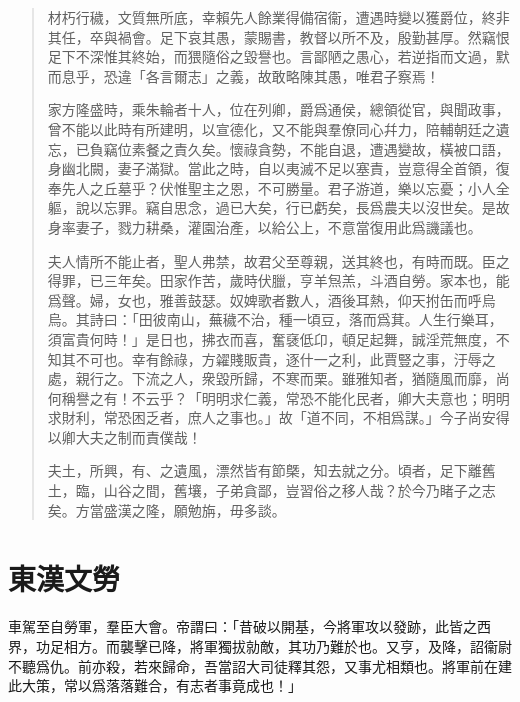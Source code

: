 \begin{quotation}
材朽行穢，文質無所底，幸賴先人餘業得備宿衞，遭遇時變以獲爵位，終非其任，卒與禍會。足下哀其愚，蒙賜書，教督以所不及，殷勤甚厚。然竊恨足下不深惟其終始，而猥隨俗之毀譽也。言鄙陋之愚心，若逆指而文過，默而息乎，恐違「各言爾志」之義，故敢略陳其愚，唯君子察焉！

家方隆盛時，乘朱輪者十人，位在列卿，爵爲通侯，總領從官，與聞政事，曾不能以此時有所建明，以宣德化，又不能與羣僚同心幷力，陪輔朝廷之遺忘，已負竊位素餐之責久矣。懷祿貪勢，不能自退，遭遇變故，橫被口語，身幽北闕，妻子滿獄。當此之時，自以夷滅不足以塞責，豈意得全首領，復奉先人之丘墓乎？伏惟聖主之恩，不可勝量。君子游道，樂以忘憂；小人全軀，說以忘罪。竊自思念，過已大矣，行已虧矣，長爲農夫以沒世矣。是故身率妻子，戮力耕桑，灌園治產，以給公上，不意當復用此爲譏議也。

夫人情所不能止者，聖人弗禁，故君父至尊親，送其終也，有時而既。臣之得罪，已三年矣。田家作苦，歲時伏臘，亨羊炰羔，斗酒自勞。家本也，能爲聲。婦，女也，雅善鼓瑟。奴婢歌者數人，酒後耳熱，仰天拊缶而呼烏烏。其詩曰：「田彼南山，蕪穢不治，種一頃豆，落而爲萁。人生行樂耳，須富貴何時！」是日也，拂衣而喜，奮褎低卬，頓足起舞，誠淫荒無度，不知其不可也。幸有餘祿，方糴賤販貴，逐什一之利，此賈豎之事，汙辱之處，親行之。下流之人，衆毀所歸，不寒而栗。雖雅知者，猶隨風而靡，尚何稱譽之有！不云乎？「明明求仁義，常恐不能化民者，卿大夫意也；明明求財利，常恐困乏者，庶人之事也。」故「道不同，不相爲謀。」今子尚安得以卿大夫之制而責僕哉！

夫土，所興，有、之遺風，漂然皆有節槩，知去就之分。頃者，足下離舊土，臨，山谷之間，舊壤，子弟貪鄙，豈習俗之移人哉？於今乃睹子之志矣。方當盛漢之隆，願勉旃，毋多談。
\end{quotation}
\vspace{-1em}
\theendnotes

\section[光武帝臨淄勞耿弇\quad{\small 東漢文}]{{\normalsize 東漢文}\quad {}勞}
車駕至自勞軍，羣臣大會。帝謂曰：「昔破以開基，今將軍攻以發跡，此皆之西界，功足相方。而襲擊已降，將軍獨拔勍敵，其功乃難於也。又亨，及降，詔衞尉不聽爲仇。前亦殺，若來歸命，吾當詔大司徒釋其怨，又事尤相類也。將軍前在建此大策，常以爲落落難合，有志者事竟成也！」

